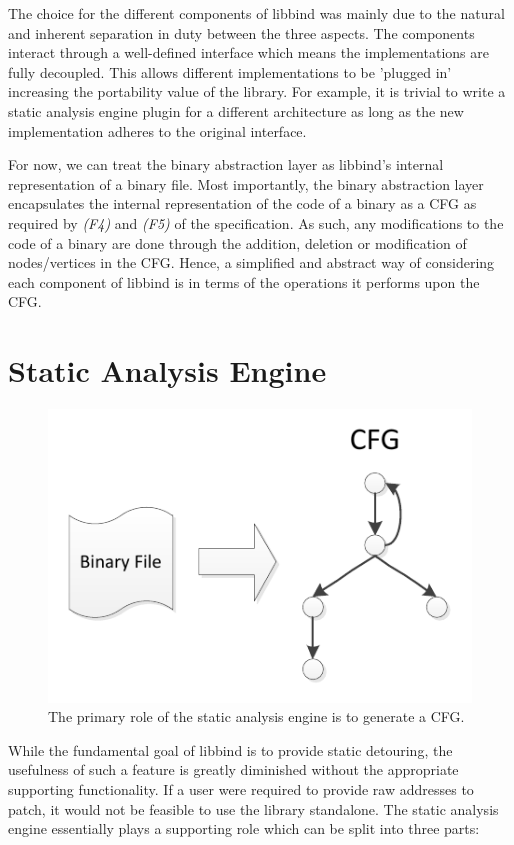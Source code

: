 The choice for the different components of libbind was mainly due to the natural and inherent separation in duty between the three aspects. The components interact through a well-defined interface which means the implementations are fully decoupled. This allows different implementations to be 'plugged in' increasing the portability value of the library. For example, it is trivial to write a static analysis engine plugin for a different architecture as long as the new implementation adheres to the original interface.

For now, we can treat the binary abstraction layer as libbind's internal representation of a binary file. Most importantly, the binary abstraction layer encapsulates the internal representation of the code of a binary as a CFG as required by \emph{(F4)} and \emph{(F5)} of the specification. As such, any modifications to the code of a binary are done through the addition, deletion or modification of nodes/vertices in the CFG. Hence, a simplified and abstract way of considering each component of libbind is in terms of the operations it performs upon the CFG.

\section{Static Analysis Engine}

\begin{figure}[H]
 \centering
 \includegraphics{Static_Analysis_Engine.pdf}
 \caption[Static Analysis Engine]{The primary role of the static analysis engine is to generate a CFG.}
\end{figure}

While the fundamental goal of libbind is to provide static detouring, the usefulness of such a feature is greatly diminished without the appropriate supporting functionality. If a user were required to provide raw addresses to patch, it would not be feasible to use the library standalone. The static analysis engine essentially plays a supporting role which can be split into three parts:

